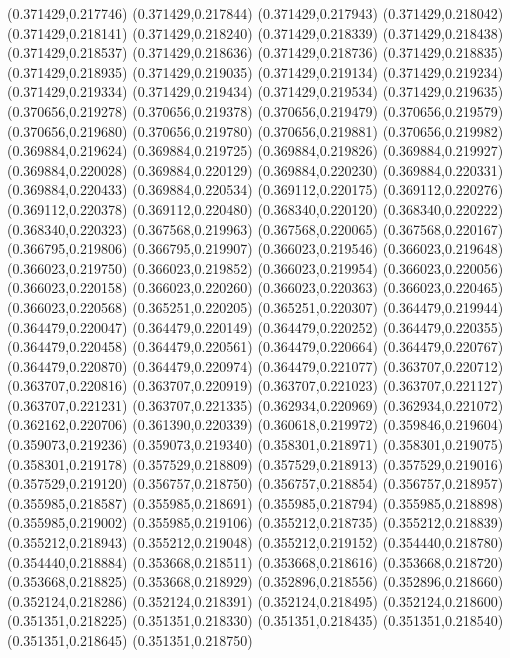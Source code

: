 (0.371429,0.217746)
(0.371429,0.217844)
(0.371429,0.217943)
(0.371429,0.218042)
(0.371429,0.218141)
(0.371429,0.218240)
(0.371429,0.218339)
(0.371429,0.218438)
(0.371429,0.218537)
(0.371429,0.218636)
(0.371429,0.218736)
(0.371429,0.218835)
(0.371429,0.218935)
(0.371429,0.219035)
(0.371429,0.219134)
(0.371429,0.219234)
(0.371429,0.219334)
(0.371429,0.219434)
(0.371429,0.219534)
(0.371429,0.219635)
(0.370656,0.219278)
(0.370656,0.219378)
(0.370656,0.219479)
(0.370656,0.219579)
(0.370656,0.219680)
(0.370656,0.219780)
(0.370656,0.219881)
(0.370656,0.219982)
(0.369884,0.219624)
(0.369884,0.219725)
(0.369884,0.219826)
(0.369884,0.219927)
(0.369884,0.220028)
(0.369884,0.220129)
(0.369884,0.220230)
(0.369884,0.220331)
(0.369884,0.220433)
(0.369884,0.220534)
(0.369112,0.220175)
(0.369112,0.220276)
(0.369112,0.220378)
(0.369112,0.220480)
(0.368340,0.220120)
(0.368340,0.220222)
(0.368340,0.220323)
(0.367568,0.219963)
(0.367568,0.220065)
(0.367568,0.220167)
(0.366795,0.219806)
(0.366795,0.219907)
(0.366023,0.219546)
(0.366023,0.219648)
(0.366023,0.219750)
(0.366023,0.219852)
(0.366023,0.219954)
(0.366023,0.220056)
(0.366023,0.220158)
(0.366023,0.220260)
(0.366023,0.220363)
(0.366023,0.220465)
(0.366023,0.220568)
(0.365251,0.220205)
(0.365251,0.220307)
(0.364479,0.219944)
(0.364479,0.220047)
(0.364479,0.220149)
(0.364479,0.220252)
(0.364479,0.220355)
(0.364479,0.220458)
(0.364479,0.220561)
(0.364479,0.220664)
(0.364479,0.220767)
(0.364479,0.220870)
(0.364479,0.220974)
(0.364479,0.221077)
(0.363707,0.220712)
(0.363707,0.220816)
(0.363707,0.220919)
(0.363707,0.221023)
(0.363707,0.221127)
(0.363707,0.221231)
(0.363707,0.221335)
(0.362934,0.220969)
(0.362934,0.221072)
(0.362162,0.220706)
(0.361390,0.220339)
(0.360618,0.219972)
(0.359846,0.219604)
(0.359073,0.219236)
(0.359073,0.219340)
(0.358301,0.218971)
(0.358301,0.219075)
(0.358301,0.219178)
(0.357529,0.218809)
(0.357529,0.218913)
(0.357529,0.219016)
(0.357529,0.219120)
(0.356757,0.218750)
(0.356757,0.218854)
(0.356757,0.218957)
(0.355985,0.218587)
(0.355985,0.218691)
(0.355985,0.218794)
(0.355985,0.218898)
(0.355985,0.219002)
(0.355985,0.219106)
(0.355212,0.218735)
(0.355212,0.218839)
(0.355212,0.218943)
(0.355212,0.219048)
(0.355212,0.219152)
(0.354440,0.218780)
(0.354440,0.218884)
(0.353668,0.218511)
(0.353668,0.218616)
(0.353668,0.218720)
(0.353668,0.218825)
(0.353668,0.218929)
(0.352896,0.218556)
(0.352896,0.218660)
(0.352124,0.218286)
(0.352124,0.218391)
(0.352124,0.218495)
(0.352124,0.218600)
(0.351351,0.218225)
(0.351351,0.218330)
(0.351351,0.218435)
(0.351351,0.218540)
(0.351351,0.218645)
(0.351351,0.218750)
